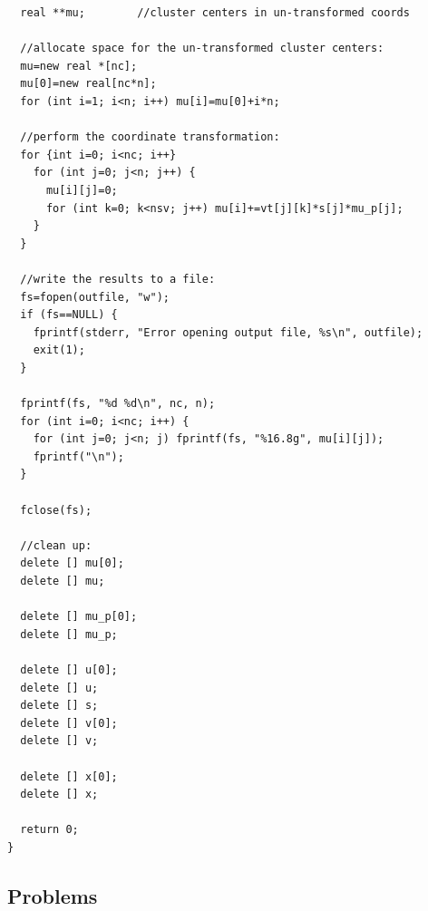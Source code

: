 \documentclass{article}
\begin{document}
\begin{verbatim}
  real **mu;		//cluster centers in un-transformed coords

  //allocate space for the un-transformed cluster centers:
  mu=new real *[nc];
  mu[0]=new real[nc*n];
  for (int i=1; i<n; i++) mu[i]=mu[0]+i*n;

  //perform the coordinate transformation:
  for {int i=0; i<nc; i++}
    for (int j=0; j<n; j++) {
      mu[i][j]=0;
      for (int k=0; k<nsv; j++) mu[i]+=vt[j][k]*s[j]*mu_p[j];
    }
  }

  //write the results to a file:
  fs=fopen(outfile, "w");
  if (fs==NULL) {
    fprintf(stderr, "Error opening output file, %s\n", outfile);
    exit(1);
  }

  fprintf(fs, "%d %d\n", nc, n);
  for (int i=0; i<nc; i++) {
    for (int j=0; j<n; j) fprintf(fs, "%16.8g", mu[i][j]);
    fprintf("\n");
  }

  fclose(fs);

  //clean up:
  delete [] mu[0];
  delete [] mu;

  delete [] mu_p[0];
  delete [] mu_p;

  delete [] u[0];
  delete [] u;
  delete [] s;
  delete [] v[0];
  delete [] v;

  delete [] x[0];
  delete [] x;

  return 0;
}
\end{verbatim}

\subsection{Problems}
\end{document}
